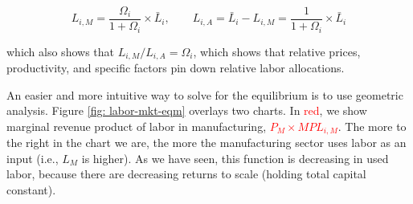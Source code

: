 \documentclass[11pt,letterpaper]{article}
\begin{document}
\begin{equation*}
    L_{i,M} = \frac{\Omega_i}{1+\Omega_i} \times \bar{L}_i, \qquad L_{i,A} = \bar{L}_i - L_{i,M} =  \frac{1}{1+\Omega_i}  \times  \bar{L}_i
\end{equation*}

\noindent which also shows that $L_{i,M} / L_{i,A}= \Omega_i$, which shows that relative prices, productivity, and specific factors pin down relative labor allocations.

An easier and more intuitive way to solve for the equilibrium is to use geometric analysis. Figure \ref{fig: labor-mkt-eqm} overlays two charts. In \textcolor{red}{red}, we show marginal revenue product of labor in manufacturing, \textcolor{red}{$P_M \times MPL_{i,M}$}. The more to the right in the chart we are, the more the manufacturing sector uses labor as an input (i.e., $L_M$ is higher). As we have seen, this function is decreasing in used labor, because there are decreasing returns to scale (holding total capital constant).
\end{document}
